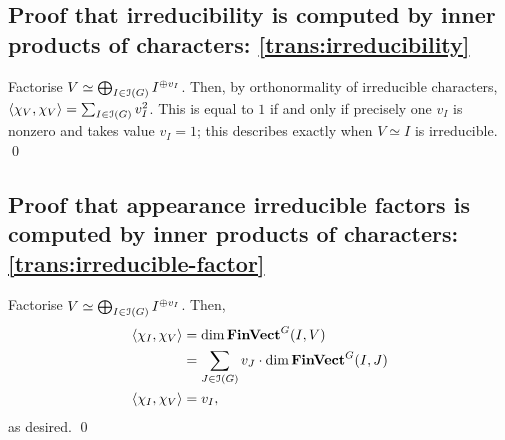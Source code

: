 \subsection{Proof that irreducibility is computed by inner products of characters: \ref{trans:irreducibility}} %
\pan Factorise $V \simeq \bigoplus_{I \in \operatorname{\mathcal{I}}(G)} I^{\oplus v_I}$. Then, by orthonormality of irreducible characters, $\langle \chi_V, \chi_V \rangle = \sum_{I \in \operatorname{\mathcal{I}}(G)} v_I^2$. This is equal to $1$ if and only if precisely one $v_I$ is nonzero and takes value $v_I = 1$; this describes exactly when $V \simeq I$ is irreducible. \qed

\subsection{Proof that appearance irreducible factors is computed by inner products of characters: \ref{trans:irreducible-factor}} %
\pan Factorise $V \simeq \bigoplus_{I \in \operatorname{\mathcal{I}}(G)} I^{\oplus v_I}$. Then,
\begin{align*}
  \langle \chi_I, \chi_V \rangle
  &= \dim \operatorname{\mathbf{FinVect}}^G (I, V)
  \\
  &= \sum_{J \in \operatorname{\mathcal{I}}(G)} v_J \cdot \dim \operatorname{\mathbf{FinVect}}^G (I, J)
  \\
  \langle \chi_I, \chi_V \rangle
  &= v_I
  ,
\end{align*}
as desired. \qed

